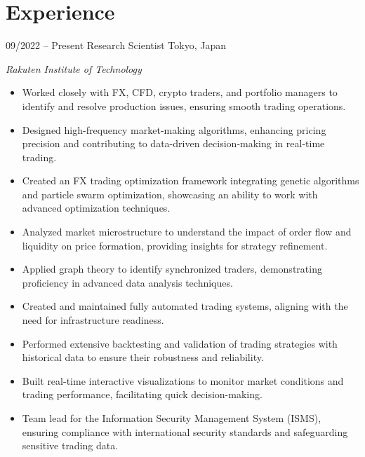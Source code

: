 

\section{Experience}
\begin{entrylist}
\entry
{09/2022 -- Present}
{Research Scientist}
{Tokyo, Japan}
{\emph{Rakuten Institute of Technology}
\begin{itemize}
    \item Worked closely with FX, CFD, crypto traders, and portfolio managers to identify and resolve production issues, ensuring smooth trading operations. %
	\item Designed high-frequency market-making algorithms, enhancing pricing precision and contributing to data-driven decision-making in real-time trading. %
  	\item Created an FX trading optimization framework integrating genetic algorithms and particle swarm optimization, showcasing an ability to work with advanced optimization techniques. %
	\item Analyzed market microstructure to understand the impact of order flow and liquidity on price formation, providing insights for strategy refinement. %
    \item Applied graph theory to identify synchronized traders, demonstrating proficiency in advanced data analysis techniques. %
    \item Created and maintained fully automated trading systems, aligning with the need for infrastructure readiness. %
    \item Performed extensive backtesting and validation of trading strategies with historical data to ensure their robustness and reliability. %
	\item Built real-time interactive visualizations to monitor market conditions and trading performance, facilitating quick decision-making. %
 	\item Team lead for the Information Security Management System (ISMS), ensuring compliance with international security standards and safeguarding sensitive trading data. %
\end{itemize}
}
\end{entrylist}

